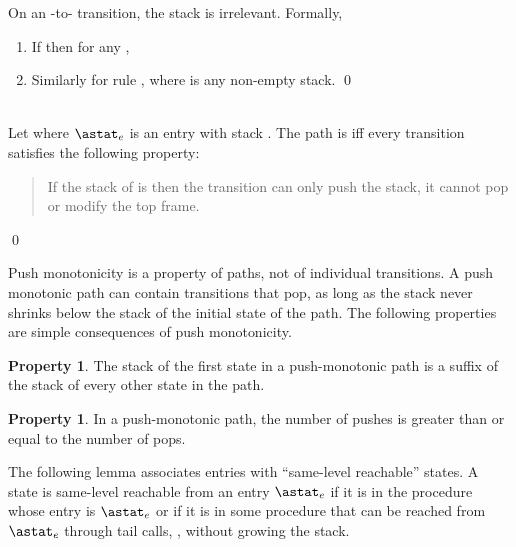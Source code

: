 \documentclass{LMCS}
\theoremstyle{definition} \newtheorem{property}[thm]{Property}
\begin{document}
\begin{lem} \label{lem:stack-apply}
  On an \daapply{}-to-\daeval{} transition, the stack is irrelevant.
  Formally, 
  \begin{enumerate}[]
  \item 
    If 
    then for any , \\
    
  \item
    Similarly for rule , where  is any non-empty stack.
    \qed
  \end{enumerate}
\end{lem}

\newcommand{\entry}{\ensuremath{\astat_e}}
\begin{defi}\label{def:push-monotonic} ~\\
  Let  
  where \entry{} is an entry with stack .
  The path  is  iff every transition  satisfies the following property:
  \begin{quote}
    If the stack of \astato{} is  then the transition can only push
    the stack, it cannot pop or modify the top frame.
  \end{quote}
  \qed
\end{defi}

\noindent
Push monotonicity is a property of paths, not of individual transitions.
A push monotonic path can contain transitions that pop, as long as the stack 
never shrinks below the stack of the initial state of the path.
The following properties are simple consequences of push monotonicity.
\begin{property}\label{prop:stack-suffix}
The stack of the first state in a push-monotonic path is a suffix of the stack
of every other state in the path.
\end{property}
\begin{property}
In a push-monotonic path, the number of pushes is greater than or equal to the
number of pops.
\end{property}

\noindent
The following lemma associates entries with ``same-level reachable'' states.
A state \astat{} is same-level reachable from an entry \entry{} if it is
in the procedure whose entry is \entry{} or if it is in some procedure
that can be reached from \entry{} through tail calls, \ie, without growing the
stack.
\end{document}
